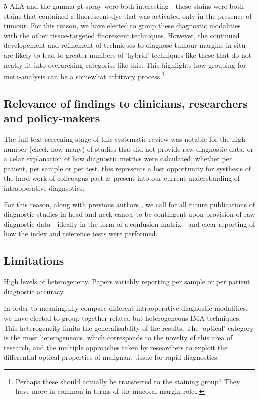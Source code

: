 5-ALA and the gamma-gt spray were both interesting - these stains were both stains that contained a fluorescent dye that was activated only in the presence of tumour. 
For this reason, we have elected to group these diagnostic modalities with the other tissue-targeted fluorescent techniques.
However, the continued developement and refinement of techniques to diagnose tumour margins in situ are likely to lead to greater numbers of 'hybrid' techniques like these that do not neatly fit into overarching categorise like this.
This highlights how grouping for meta-analysis can be a somewhat arbitrary process.\footnote{Perhaps these should actually be transferred to the staining group? They have more in common in terms of the mucosal margin role\ldots}


\subsection{Relevance of findings to clinicians, researchers and policy-makers}

The full text screening stage of this systematic review was notable for the high number (check how many) of studies that did not provide raw diagnostic data, or a celar explanation of how diagnostic metrics were calculated, whether per patient, per sample or per test.
this represents a lost opportunity for systhesis of the hard work of colleoagus past \& present into our current understanding of intraoperative diagnsotics.

For this reason, along with previous authors \cite{stjohnDiagnosticAccuracyIntraoperative2017, irwigGuidelinesMetaanalysesEvaluating1994}, we call for all future publications of diagnostic studies in head and neck cancer to be contingent upon provision of raw diagnostic data---ideally in the form of a confusion matrix---and clear reporting of how the index and reference tests were performed.


\subsection{Limitations}

High levels of heterogeneity.
Papers variably reporting per sample or per patient diagnostic accuracy.

In order to meaningfully compare different intraoperative diagnostic modalities, we have elected to group together related but heterogeneous IMA techniques. 
This heterogeneity limits the generalisability of the results.
The 'optical' category is the most heterogeneous, which corresponds to the novelty of this area of research, and the multiple approaches taken by researchers to exploit the differential optical properties of malignant tissue for rapid diagnostics.


